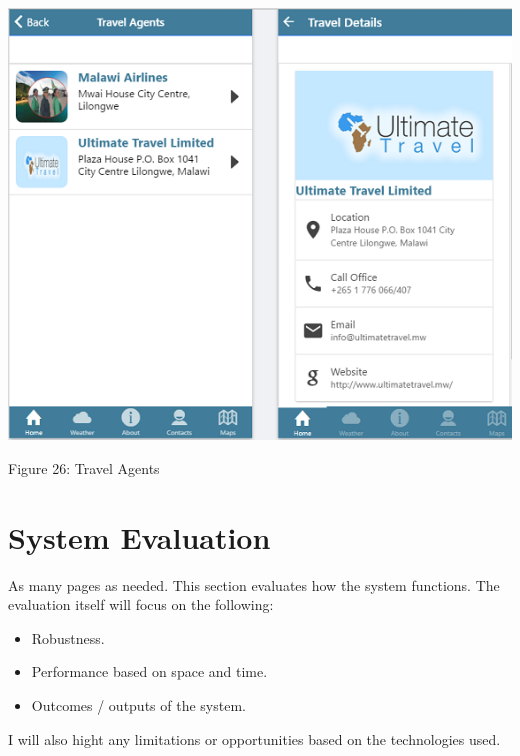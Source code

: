 \begin{center}    
	\includegraphics{img/travel.png}
\end{center}
\begin{center}
	Figure 26: Travel Agents 
\end{center}
\paragraph{}



\chapter{System Evaluation}
As many pages as needed.
This section evaluates how the system functions. The evaluation itself will focus on the following: 
\begin{itemize}
	\item Robustness.  
	\item Performance based on space and time.
	\item Outcomes / outputs of the system.
\end{itemize}

I will also hight any limitations or opportunities based on the technologies used.

\paragraph{}
